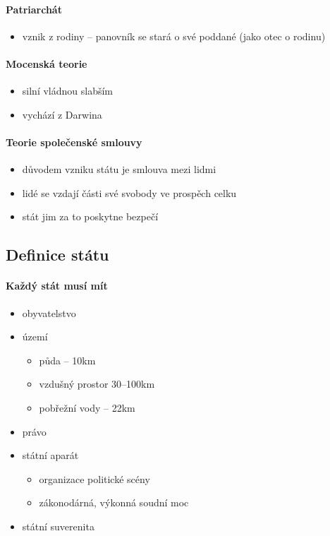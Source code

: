 \paragraph{Patriarchát}
\begin{itemize}
\item vznik z rodiny -- panovník se stará o své poddané (jako otec o rodinu)
\end{itemize}

\paragraph{Mocenská teorie}
\begin{itemize}
\item silní vládnou slabším
\item vychází z Darwina
\end{itemize}

\paragraph{Teorie společenské smlouvy}
\begin{itemize}
\item důvodem vzniku státu je smlouva mezi lidmi
\item lidé se vzdají části své svobody ve prospěch celku
\item stát jim za to poskytne bezpečí
\end{itemize}


\subsection{Definice státu}
\paragraph{Každý stát musí mít}
\begin{itemize}
\item obyvatelstvo
\item území
	\begin{itemize}
	\item půda -- 10km
	\item vzdušný prostor 30--100km
	\item pobřežní vody -- 22km
	\end{itemize}
\item právo
\item státní aparát
	\begin{itemize}
	\item organizace politické scény
	\item zákonodárná, výkonná soudní moc
	\end{itemize}
\item státní suverenita
\end{itemize}

